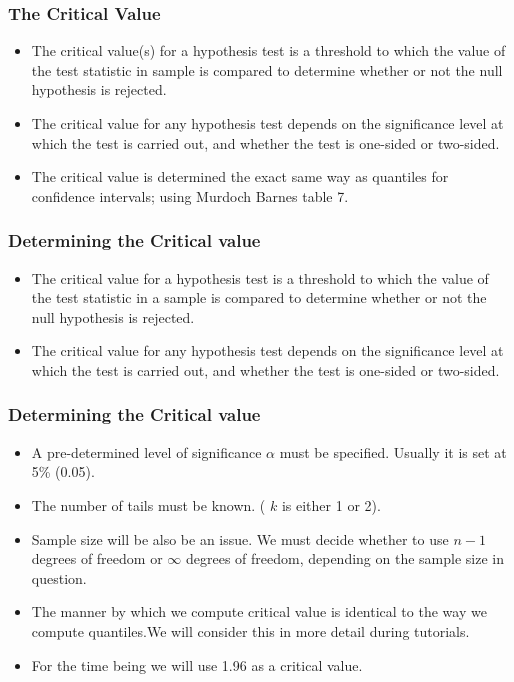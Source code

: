 \documentclass[]{report}
\begin{document}
\subsubsection{The Critical Value}


\begin{itemize}
\item The critical value(s) for a hypothesis test is a threshold to which the value of the test statistic in sample is compared to determine whether or not the null hypothesis is rejected.
\item The critical value for any hypothesis test depends on the significance level at which the test is carried out, and whether the test is one-sided or two-sided.
\item The critical value is determined the exact same way as quantiles for confidence intervals; using Murdoch Barnes table 7.


\end{itemize}







\subsubsection{Determining the Critical value}
\begin{itemize} \item The critical value for a hypothesis test is a threshold to which the value of the test statistic in a sample is compared to determine whether or not the null hypothesis is rejected.

\item The critical value for any hypothesis test depends on the significance level at which the test is carried out, and whether the test is one-sided or two-sided.
\end{itemize}






\subsubsection{Determining the Critical value}
\begin{itemize}
\item A pre-determined level of significance $\alpha$ must be specified. Usually it is set at 5\% (0.05).
\item The number of tails must be known. ( $k$ is either 1 or 2).
\item Sample size will be also be an issue. We must decide whether to use $n-1$ degrees of freedom or $\infty$ degrees of freedom, depending on the sample size in question.
\item The manner by which we compute critical value is identical to the way we compute quantiles.We will consider this in more detail during tutorials.
\item For the time being we will use 1.96 as a critical value.
\end{itemize}
\end{document}
